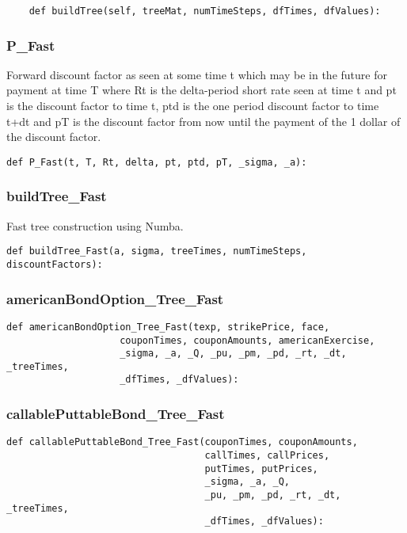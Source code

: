 \documentclass[twoside,11pt]{book}
\begin{document}
\begin{lstlisting}
    def buildTree(self, treeMat, numTimeSteps, dfTimes, dfValues):
\end{lstlisting}

\subsubsection*{{\bf P\_Fast}}
Forward discount factor as seen at some time t which may be in the future for payment at time T where Rt is the delta-period short rate seen at time t and pt is the discount factor to time t, ptd is the one period discount factor to time t+dt and pT is the discount factor from now until the payment of the 1 dollar of the discount factor.  

\begin{lstlisting}
def P_Fast(t, T, Rt, delta, pt, ptd, pT, _sigma, _a):
\end{lstlisting}

\subsubsection*{{\bf buildTree\_Fast}}
Fast tree construction using Numba.  

\begin{lstlisting}
def buildTree_Fast(a, sigma, treeTimes, numTimeSteps, discountFactors):
\end{lstlisting}

\subsubsection*{{\bf americanBondOption\_Tree\_Fast}}


\begin{lstlisting}
def americanBondOption_Tree_Fast(texp, strikePrice, face,
                    couponTimes, couponAmounts, americanExercise,
                    _sigma, _a, _Q, _pu, _pm, _pd, _rt, _dt, _treeTimes,
                    _dfTimes, _dfValues):
\end{lstlisting}

\subsubsection*{{\bf callablePuttableBond\_Tree\_Fast}}


\begin{lstlisting}
def callablePuttableBond_Tree_Fast(couponTimes, couponAmounts, 
                                   callTimes, callPrices, 
                                   putTimes, putPrices,
                                   _sigma, _a, _Q,
                                   _pu, _pm, _pd, _rt, _dt, _treeTimes,
                                   _dfTimes, _dfValues):
\end{lstlisting}
\end{document}
